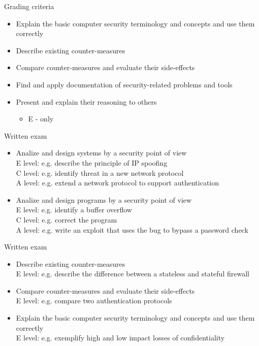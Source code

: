 \documentclass{beamer}
\begin{document}
\begin{frame}{Grading criteria}
  \begin{itemize}
    \item Explain the basic computer security terminology and concepts and use them correctly
    \item Describe existing counter-measures
    \item Compare counter-measures and evaluate their side-effects
    \item Find and apply documentation of security-related problems and tools
    \item Present and explain their reasoning to others
    \begin{itemize}
    \item E - only
    \end{itemize}
  \end{itemize}
\end{frame}


\begin{frame}{Written exam}
  \begin{itemize}
\item Analize and design systems by a security point of view\\
E level: e.g. describe the principle of IP spoofing\\
C level: e.g. identify threat in a new network protocol\\
A level: e.g. extend a network protocol to support authentication
\item Analize and design programs by a security point of view\\
E level: e.g. identify a buffer overflow\\
C level: e.g. correct the program\\
A level: e.g. write an exploit that uses the bug to bypass a password check
\end{itemize}
\end{frame}

\begin{frame}{Written exam}
  \begin{itemize}
\item Describe existing counter-measures\\
E level: e.g. describe the difference between a stateless and stateful firewall
\item Compare counter-measures and evaluate their side-effects\\
E level: e.g. compare two authentication protocols
\item Explain the basic computer security terminology and concepts and use them correctly\\
E level: e.g. exemplify high and low impact losses of confidentiality
  \end{itemize}
  \end{frame}
\end{document}
